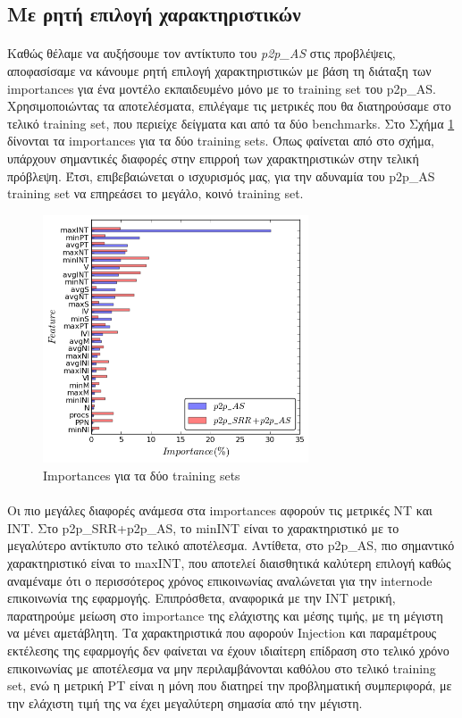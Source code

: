 \subsection{Με ρητή επιλογή χαρακτηριστικών}
\paragraph{}
Καθώς θέλαμε να αυξήσουμε τον αντίκτυπο του \textit{p2p\_AS} στις προβλέψεις, αποφασίσαμε να κάνουμε ρητή επιλογή χαρακτηριστικών με βάση τη διάταξη των importances για ένα μοντέλο εκπαιδευμένο μόνο με το training set του p2p\_AS. Χρησιμοποιώντας τα αποτελέσματα, επιλέγαμε τις μετρικές που θα διατηρούσαμε στο τελικό training set, που περιείχε δείγματα και από τα δύο benchmarks. Στο Σχήμα \ref{fig:importances} δίνονται τα importances για τα δύο training sets. Όπως φαίνεται από στο σχήμα, υπάρχουν σημαντικές διαφορές στην επιρροή των χαρακτηριστικών στην τελική πρόβλεψη. Έτσι, επιβεβαιώνεται ο ισχυρισμός μας, για την αδυναμία του p2p\_AS training set να επηρεάσει το μεγάλο, κοινό training set.

\begin{figure}[ht]
    \centering
    \includegraphics[width=0.7\textwidth]{./images/importance.png}
    \caption{Importances για τα δύο training sets}
    \label{fig:importances}
\end{figure}

\paragraph{}
Οι πιο μεγάλες διαφορές ανάμεσα στα importances αφορούν τις μετρικές NT και ΙΝΤ. Στο p2p\_SRR+p2p\_AS, το minINT είναι το χαρακτηριστικό με το μεγαλύτερο αντίκτυπο στο τελικό αποτέλεσμα. Αντίθετα, στο p2p\_AS, πιο σημαντικό χαρακτηριστικό είναι το maxINT, που αποτελεί διαισθητικά καλύτερη επιλογή καθώς αναμέναμε ότι ο περισσότερος χρόνος επικοινωνίας αναλώνεται για την internode επικοινωνία της εφαρμογής. Επιπρόσθετα, αναφορικά με την INT μετρική, παρατηρούμε μείωση στο importance της ελάχιστης και μέσης τιμής, με τη μέγιστη να μένει αμετάβλητη. Τα χαρακτηριστικά που αφορούν Injection και παραμέτρους εκτέλεσης της εφαρμογής δεν φαίνεται να έχουν ιδιαίτερη επίδραση στο τελικό χρόνο επικοινωνίας με αποτέλεσμα να μην περιλαμβάνονται καθόλου στο τελικό training set, ενώ η μετρική PT είναι η μόνη που διατηρεί την προβληματική συμπεριφορά, με την ελάχιστη τιμή της να έχει μεγαλύτερη σημασία από την μέγιστη.

